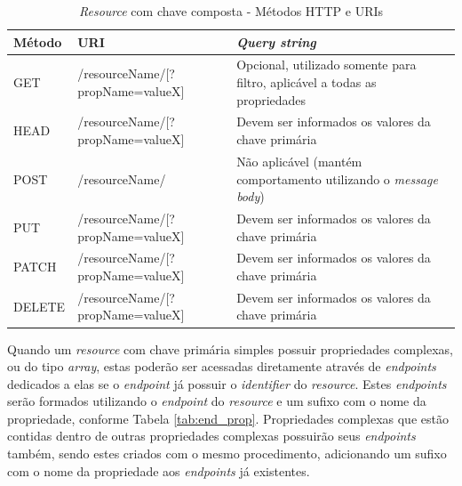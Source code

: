 \begin{table}[]
    \centering
    \begin{tabularx}{\textwidth}{|l|l|X|}
        \hline
        \textbf{Método} & \textbf{URI} & \textbf{\textit{Query string}} \\
        \hline

        GET & /resourceName/[?propName=valueX] & Opcional, utilizado somente para filtro, aplicável a todas as propriedades\\
        \hline

        HEAD & /resourceName/[?propName=valueX] & Devem ser informados os valores da chave primária\\
        \hline

        POST & /resourceName/ & Não aplicável (mantém comportamento utilizando o \textit{message body})\\
        \hline

        PUT & /resourceName/[?propName=valueX] & Devem ser informados os valores da chave primária\\
        \hline

        PATCH & /resourceName/[?propName=valueX] & Devem ser informados os valores da chave primária\\
        \hline

        DELETE & /resourceName/[?propName=valueX] & Devem ser informados os valores da chave primária\\
        \hline
    \end{tabularx}
    \caption{\textit{Resource} com chave composta - Métodos HTTP e URIs}
    \label{tab:http_2}
\end{table}

Quando um \textit{resource} com chave primária simples possuir propriedades complexas, ou do tipo \textit{array}, estas poderão ser acessadas diretamente através de \textit{endpoints} dedicados a elas se o \textit{endpoint} já possuir o \textit{identifier} do \textit{resource}. Estes \textit{endpoints} serão formados utilizando o \textit{endpoint} do \textit{resource} e um sufixo com o nome da propriedade, conforme Tabela \ref{tab:end_prop}. Propriedades complexas que estão contidas dentro de outras propriedades complexas possuirão seus \textit{endpoints} também, sendo estes criados com o mesmo procedimento, adicionando um sufixo com o nome da propriedade aos \textit{endpoints} já existentes.


